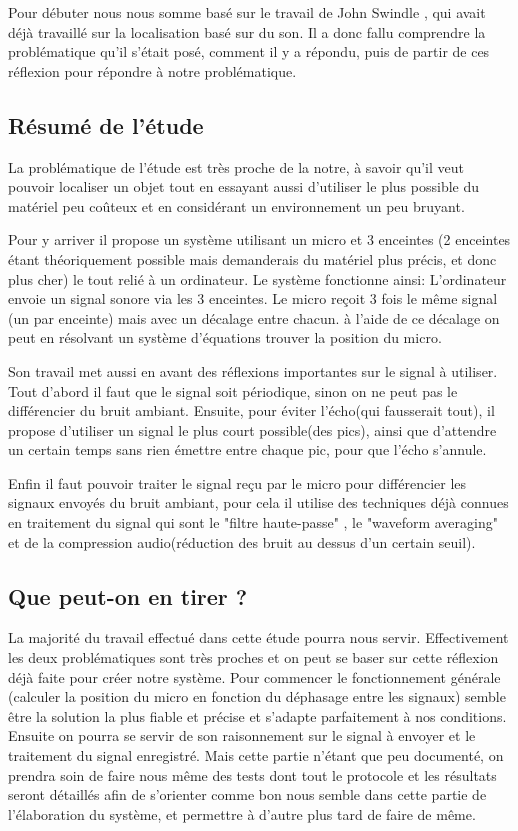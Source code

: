 \documentclass[12pt,a4paper]{report}
\begin{document}
Pour débuter nous nous somme basé sur le travail de John Swindle \cite{john_swindle2010}, qui avait déjà travaillé sur la localisation basé sur du son. Il a donc fallu comprendre la problématique qu'il s'était posé, comment il y a répondu, puis de partir de ces réflexion pour répondre à notre problématique.

\subsection{Résumé de l'étude}
La problématique de l'étude est très proche de la notre, à savoir qu'il veut pouvoir localiser un objet tout en essayant aussi d'utiliser le plus possible du matériel peu coûteux et en considérant un environnement un peu bruyant.

Pour y arriver il propose un système utilisant un micro et 3 enceintes (2 enceintes étant théoriquement possible mais demanderais du matériel plus précis, et donc plus cher) le tout relié à un ordinateur.
Le système fonctionne ainsi: L'ordinateur envoie un signal sonore via les 3 enceintes. Le micro reçoit 3 fois le même signal (un par enceinte) mais avec un décalage entre chacun. à l'aide de ce décalage on peut en résolvant un système d'équations trouver la position du micro.

Son travail met aussi en avant des réflexions importantes sur le signal à utiliser. Tout d'abord il faut que le signal soit périodique, sinon on ne peut pas le différencier du bruit ambiant. Ensuite, pour éviter l'écho(qui fausserait tout), il propose d'utiliser un signal le plus court possible(des pics), ainsi que d'attendre un certain temps sans rien émettre entre chaque pic, pour que l'écho s'annule.

Enfin il faut pouvoir traiter le signal reçu par le micro pour différencier les signaux envoyés du bruit ambiant, pour cela il utilise des techniques déjà connues en traitement du signal qui sont le "filtre haute-passe" , le "waveform averaging" et de la compression audio(réduction des bruit au dessus d'un certain seuil).


\subsection{Que peut-on en tirer ?}

La majorité du travail effectué dans cette étude pourra nous servir. Effectivement les  deux problématiques sont très proches et on peut se baser sur cette réflexion déjà faite pour créer notre système.
Pour commencer le fonctionnement générale (calculer la position du micro en fonction du déphasage entre les signaux) semble être la solution la plus fiable et précise et s'adapte parfaitement à nos conditions.
Ensuite on pourra se servir de son raisonnement sur le signal à envoyer et le traitement du signal enregistré. Mais cette partie n'étant que peu documenté, on prendra soin de faire nous même des tests dont tout le protocole et les résultats seront détaillés afin de s'orienter comme bon nous semble dans cette partie de l'élaboration du système, et permettre à d'autre plus tard de faire de même.
\end{document}
